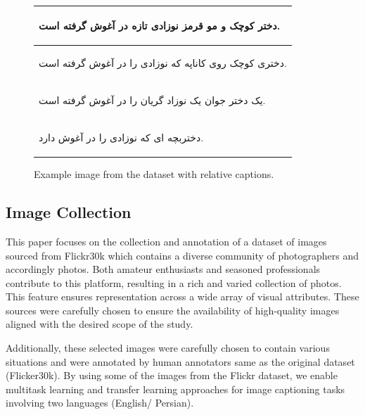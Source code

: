 \documentclass[runningheads]{llncs}
\begin{document}
\begin{figure}[htbp]
\begin{center}
\begin{minipage}[t]{0.6\textwidth}
\begin{tabularx}{\linewidth}{|X|}
      \hline
      \begin{farsi} \arabicfont\small دختر کوچک و مو قرمز نوزادی تازه در آغوش گرفته است.\end{farsi} \\ 
      \hline
      \begin{farsi} \arabicfont\small دختری کوچک روی کاناپه که نوزادی را در آغوش گرفته است.\end{farsi} \\
      \hline
      \begin{farsi} \arabicfont\small یک دختر جوان یک نوزاد گریان را در آغوش گرفته است.\end{farsi} \\
      \hline
      \begin{farsi} \arabicfont\small دختربچه ای که نوزادی را در آغوش دارد.\end{farsi} \\
      \hline
    \end{tabularx}
  \end{minipage}
  \caption{Example image from the dataset with relative captions.}
  \label{fig1}
    \end{center}
\end{figure}

\subsection{Image Collection}
This paper focuses on the collection and annotation of a dataset of images sourced from Flickr30k \cite{Flickr30k} which contains a diverse community of photographers and accordingly photos. Both amateur enthusiasts and seasoned professionals contribute to this platform, resulting in a rich and varied collection of photos. This feature ensures representation across a wide array of visual attributes. These sources were carefully chosen to ensure the availability of high-quality images aligned with the desired scope of the study.

Additionally, these selected images were carefully chosen to contain various situations and were annotated by human annotators same as the original dataset (Flicker30k). By using some of the images from the Flickr dataset, we enable multitask learning and transfer learning approaches for image captioning tasks involving two languages (English/ Persian).
\end{document}
